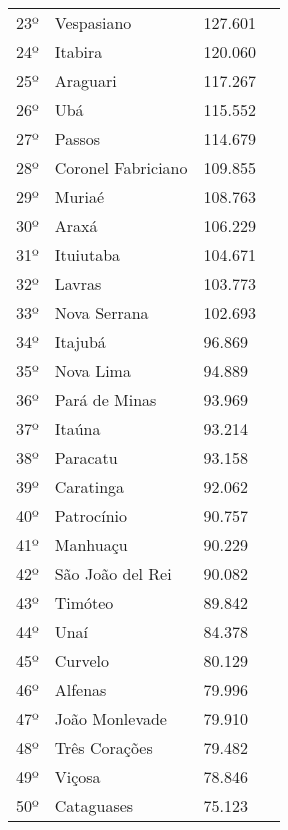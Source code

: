 \begin{table}[H]
\begin{tabular}{r|l|l|l}
		23º      & Vespasiano           & 127.601         \\
		24º      & Itabira              & 120.060         \\
		25º      & Araguari             & 117.267         \\
		26º      & Ubá                  & 115.552         \\
		27º      & Passos               & 114.679         \\
		28º      & Coronel Fabriciano   & 109.855         \\
		29º      & Muriaé               & 108.763         \\
		30º      & Araxá                & 106.229         \\
		31º      & Ituiutaba            & 104.671         \\
		32º      & Lavras               & 103.773         \\
		33º      & Nova Serrana         & 102.693         \\		
		34º      & Itajubá              & 96.869          \\
		35º      & Nova Lima            & 94.889          \\
		36º      & Pará de Minas        & 93.969          \\
		37º      & Itaúna               & 93.214          \\
		38º      & Paracatu             & 93.158          \\
		39º      & Caratinga            & 92.062          \\
		40º      & Patrocínio           & 90.757          \\
		41º      & Manhuaçu             & 90.229          \\
		42º      & São João del Rei     & 90.082          \\
		43º      & Timóteo              & 89.842          \\
		44º      & Unaí                 & 84.378          \\
		45º      & Curvelo              & 80.129          \\
		46º      & Alfenas              & 79.996          \\
		47º      & João Monlevade       & 79.910          \\
		48º      & Três Corações        & 79.482          \\
		49º      & Viçosa               & 78.846          \\
		50º      & Cataguases           & 75.123          \\ 
	\end{tabular}
\end{table}